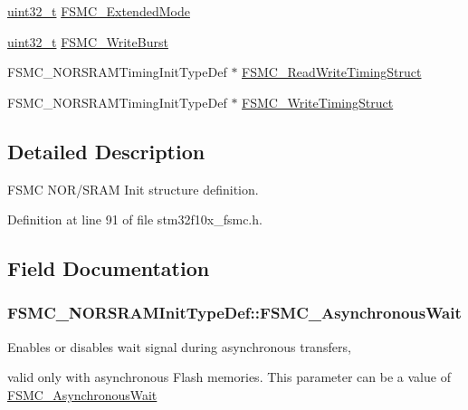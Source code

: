 \begin{DoxyCompactItemize}
\item 
\hyperlink{stdint_8h_a435d1572bf3f880d55459d9805097f62}{uint32\-\_\-t} \hyperlink{struct_f_s_m_c___n_o_r_s_r_a_m_init_type_def_af33d0076b5bfea3a66e388ed7f3eb3f3}{F\-S\-M\-C\-\_\-\-Extended\-Mode}
\item 
\hyperlink{stdint_8h_a435d1572bf3f880d55459d9805097f62}{uint32\-\_\-t} \hyperlink{struct_f_s_m_c___n_o_r_s_r_a_m_init_type_def_adac3756711f2d76e56a8cbcb7a03843d}{F\-S\-M\-C\-\_\-\-Write\-Burst}
\item 
F\-S\-M\-C\-\_\-\-N\-O\-R\-S\-R\-A\-M\-Timing\-Init\-Type\-Def $\ast$ \hyperlink{struct_f_s_m_c___n_o_r_s_r_a_m_init_type_def_a89727833f179b72ede3f11396c01732c}{F\-S\-M\-C\-\_\-\-Read\-Write\-Timing\-Struct}
\item 
F\-S\-M\-C\-\_\-\-N\-O\-R\-S\-R\-A\-M\-Timing\-Init\-Type\-Def $\ast$ \hyperlink{struct_f_s_m_c___n_o_r_s_r_a_m_init_type_def_a4ca9ddc4f0dbad8192d672e78bf3be3d}{F\-S\-M\-C\-\_\-\-Write\-Timing\-Struct}
\end{DoxyCompactItemize}


\subsection{Detailed Description}
F\-S\-M\-C N\-O\-R/\-S\-R\-A\-M Init structure definition. 

Definition at line 91 of file stm32f10x\-\_\-fsmc.\-h.



\subsection{Field Documentation}
\hypertarget{struct_f_s_m_c___n_o_r_s_r_a_m_init_type_def_ac350cc34377fe3d5f882a6801bab1ac9}{
\subsubsection[{F\-S\-M\-C\-\_\-\-Asynchronous\-Wait}]{ F\-S\-M\-C\-\_\-\-N\-O\-R\-S\-R\-A\-M\-Init\-Type\-Def\-::\-F\-S\-M\-C\-\_\-\-Asynchronous\-Wait}}\label{struct_f_s_m_c___n_o_r_s_r_a_m_init_type_def_ac350cc34377fe3d5f882a6801bab1ac9}
\begin{DoxyVerb}      Enables or disables wait signal during asynchronous transfers,
\end{DoxyVerb}
 valid only with asynchronous Flash memories. This parameter can be a value of \hyperlink{group___f_s_m_c___asynchronous_wait}{F\-S\-M\-C\-\_\-\-Asynchronous\-Wait} 

